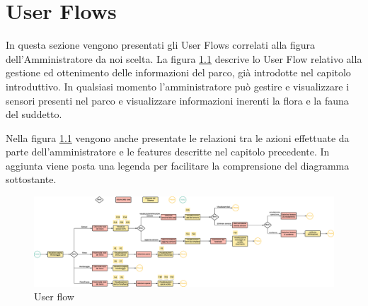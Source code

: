 \chapter{User Flows}
\label{capitolo3}
In questa sezione vengono presentati gli User Flows correlati alla figura dell'Amministratore da noi scelta. La figura \ref{fig:userFlow} descrive lo User Flow relativo alla gestione ed ottenimento delle informazioni del parco, già introdotte nel capitolo introduttivo. In qualsiasi momento l'amministratore può gestire e visualizzare i sensori presenti nel parco e visualizzare informazioni inerenti la flora e la fauna del suddetto.

Nella figura \ref{fig:userFlow} vengono anche presentate le relazioni tra le azioni effettuate da parte dell'amministratore e le features descritte nel capitolo precedente. In aggiunta viene posta una legenda per facilitare la comprensione del diagramma sottostante.


\begin{figure}[ht]
    \centering
    \includegraphics[scale=0.25,angle=90,origin=c]{Img/userFlow.eps}
    \caption{User flow}
    \label{fig:userFlow}
\end{figure}
